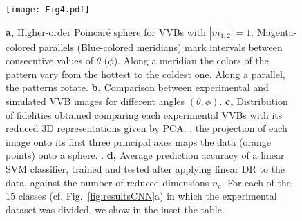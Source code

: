 \documentclass[
	aps, prl, superscriptaddress, twocolumn,
	10pt
	floatfix, 
    nofootinbib,
	tightenlines
]{revtex4-1}
\begin{document}
\begin{figure}[t]
    \centering
    \texttt{[image: Fig4.pdf]}
    \caption{
    \textbf{a,}
    Higher-order Poincar\'e sphere for \ac{VVB}s with $|m_{1,2}|=1$. Magenta-colored parallels (Blue-colored meridians) mark intervals between consecutive values of $\theta$ ($\phi$). 
    Along a meridian the colors of the pattern vary from the hottest to the coldest one. Along a parallel, the patterns rotate. 
    \textbf{b,}
    Comparison between experimental and simulated \ac{VVB} images for different angles $(\theta, \phi)$.
    \textbf{c,}
    Distribution of fidelities obtained comparing each experimental VVBs with its reduced 3D representations given by PCA.
    , the 
    projection of each image onto its first three principal axes maps the data (orange points) onto a sphere. %
    .
    \textbf{d,}
    Average prediction accuracy  of a linear SVM classifier, trained and tested after applying linear DR to the data, against the number of reduced dimensions $n_c$.
    For each of the 15 classes (cf. Fig.~\ref{fig:resultsCNN}a) in which the experimental dataset was divided, we show in the inset the  table. 
    }%
    \label{fig:PCAresults}
\end{figure}
\end{document}

